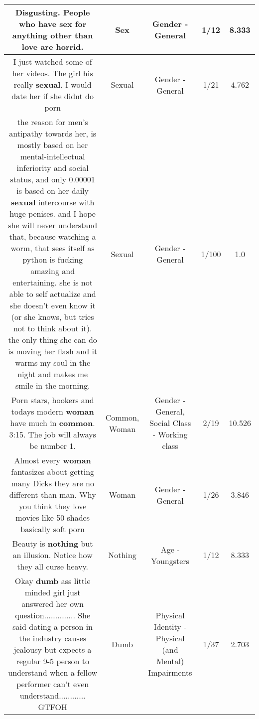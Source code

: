 \documentclass[11pt]{article}
\newlength\mylength
\begin{document}
\begin{center}
\begin{longtable}{|C{.65\mylength}|C{.30\mylength}|C{.12\mylength}|C{.12\mylength}|C{.12\mylength}|}
  \small Disgusting. People who have \textbf{sex} for anything other than love are horrid.\normalsize   & Sex & Gender - General & 1/12 & 8.333 \\  \hline
  \small I just watched some of her videos. The girl his really \textbf{sexual}. I would date her if she didnt do porn\normalsize   & Sexual & Gender - General & 1/21 & 4.762 \\  \hline
  \small the reason for men's antipathy towards her, is mostly based on her mental-intellectual inferiority and social status, and only 0.00001 is based on her daily \textbf{sexual} intercourse with huge penises. and I hope she will never understand that, because watching a worm, that sees itself as python is fucking amazing and entertaining. she is not able to self actualize and she doesn't even know it (or she knows, but tries not to think about it). the only thing she can do is moving her flash and it warms my soul in the night and makes me smile in the morning.\normalsize   & Sexual & Gender - General & 1/100 & 1.0 \\  \hline
  \small Porn stars, hookers and todays modern \textbf{woman} have much in \textbf{common}. 3:15. The job will always be number 1.\normalsize   & Common, Woman & Gender - General, Social Class - Working class & 2/19 & 10.526 \\  \hline
  \small Almost every \textbf{woman} fantasizes about getting many Dicks they are no different than man. Why you think they love movies like 50 shades basically soft porn\normalsize   & Woman & Gender - General & 1/26 & 3.846 \\  \hline
  \small Beauty is \textbf{nothing} but an illusion. Notice how they all curse heavy.\normalsize   & Nothing & Age - Youngsters & 1/12 & 8.333 \\  \hline
  \small Okay \textbf{dumb} ass little minded girl just answered her own question.............. She said dating a person in the industry causes jealousy but expects a regular 9-5 person to understand when a fellow performer can't even understand............ GTFOH\normalsize   & Dumb & Physical Identity - Physical (and Mental) Impairments & 1/37 & 2.703 \\  \hline

\end{longtable}
\end{center}
\end{document}
